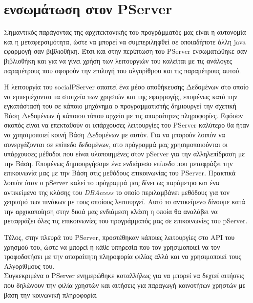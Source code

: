 \vfill

\section{ενσωμάτωση στον PServer}

\noindent
Σημαντικός παράγοντας της αρχιτεκτονικής του προγράμματός μας είναι η αυτονομία και η μεταφερσιμότητα, ώστε να μπορεί να συμπεριληφθεί σε οποιαδήποτε άλλη java εφαρμογή σαν βιβλιοθήκη.
Έτσι και στην περίπτωση του PServer ενσωματώθηκε σαν βιβλιοθήκη και για να γίνει χρήση των λειτουργιών του καλείται με τις ανάλογες παραμέτρους που αφορούν την επιλογή του αλγορίθμου και τις
παραμέτρους αυτού.

Η λειτουργία του socialPServer απαιτεί ένα μέσο αποθήκευσης Δεδομένων στο οποίο να εμπεριέχονται τα στοιχεία των χρηστών και της εφαρμογής,
επομένως κατά την εγκατάστασή του σε κάποιο μηχάνημα ο προγραμματιστής δημιουργεί την σχετική Βάση Δεδομένων ή κάποιου τύπου αρχείο με τις απαραίτητες πληροφορίες.
Εφόσον σκοπός είναι να επεκταθούν οι υπάρχουσες λειτουργίες του PServer καλύτερο θα ήταν να χρησιμοποιεί κοινή Βάση Δεδομένων με αυτόν. 
Για να μπορούν λοιπόν να συνεργάζονται σε επίπεδο δεδομένων, στο πρόγραμμά μας χρησιμοποιούνται οι υπάρχουσες μέθοδοι που είναι υλοποιημένες στον pServer για την αλληλεπίδραση με την Βάση.
Επομένως δημιουργήσαμε ένα ενδιάμεσο επίπεδο που μεταφράζει την επικοινωνία μας με την Βάση στις μεθόδους επικοινωνίας του PServer. 
Πρακτικά λοιπόν όταν ο pServer καλεί το πρόγραμμά μας δίνει ως παράμετρο και 
ένα αντικείμενο της κλάσης του \emph{DBAccess} το οποίο περιλαμβάνει μεθόδους για τον χειρισμό των πινάκων με τους οποίους λειτουργεί.
Αυτό το αντικείμενο δίνουμε κατά την αρχικοποίηση στην δικιά μας ενδιάμεση κλάση η οποία θα αναλάβει να μεταφράζει όλες τις επικοινωνίες 
του προγράμματός μας σε επικοινωνίες του pServer.

Τέλος, στην πλευρά του PServer, προστέθηκαν κάποιες λειτουργίες στο API του χρησμού του,
ώστε να μπορεί η κάθε υπηρεσία που τον χρησιμοποιεί να τον τροφοδοτήσει με την 
απαραίτητη πληροφορία φιλίας αλλά και να χρησιμοποιεί τους Αλγορίθμους του.\\
Συγκεκριμένα ο PServer ενημερώθηκε καταλλήλως για να μπορεί να δεχτεί αιτήσεις που δηλώνουν την φιλία χρηστών και αιτήσεις
για παραγωγή κοινοτήτων χρηστών με βάση την κοινωνική πληροφορία.


